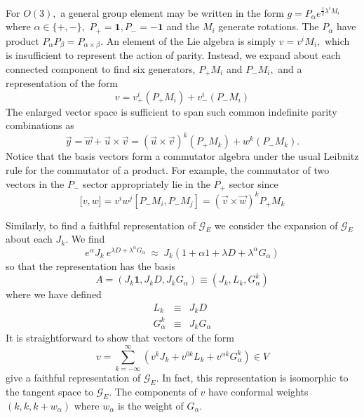 \documentclass[a4paper,12pt]{article}
\begin{document}
For $O(3),$ a general group element may be written in the form $g=P_{\alpha
}e^{\frac{1}{2}\lambda ^{i}M_{i}}$ where $\alpha \in \{+,-\},$ $P_{+}=%
\mathbf{1},P_{-}=-\mathbf{1}$ and the $M_{i}$ generate rotations. The $%
P_{\alpha }$ have product $P_{\alpha }P_{\beta }=P_{\alpha \times \beta }.$
An element of the Lie algebra is simply $v=v^{i}M_{i},$ which is
insufficient to represent the action of parity. Instead, we expand about
each connected component to find six generators, $P_{+}M_{i}$ and $%
P_{-}M_{i},$ and a representation of the form 
\begin{equation}
v=v_{+}^{i}(P_{+}M_{i})+v_{-}^{i}(P_{-}M_{i})
\end{equation}
The enlarged vector space is sufficient to span such common indefinite
parity combinations as 
\begin{equation}
\vec{y}=\vec{w}+\vec{u}\times \vec{v}=(\vec{u}\times \vec{v}%
)^{k}(P_{+}M_{k})+w^{k}(P_{-}M_{k}).
\end{equation}
Notice that the basis vectors form a commutator algebra under the usual
Leibnitz rule for the commutator of a product. For example, the commutator
of two vectors in the $P_{-}$ sector appropriately lie in the $P_{+}$ sector
since 
\begin{equation}
\lbrack v,w]=v^{i}w^{j}[P_{-}M_{i},P_{-}M_{j}]=(\vec{v}\times \vec{w}%
)^{k}P_{+}M_{k}
\end{equation}

Similarly, to find a faithful representation of $\mathcal{G}_{E}$ we
consider the expansion of $\mathcal{G}_{E}$ about each $J_{k}.$ We find 
\begin{equation}
e^{\alpha }J_{k}\ e^{\lambda D+\lambda ^{\alpha }G_{\alpha }}\ \approx\
J_{k}(1+\alpha 1+\lambda D+\lambda ^{\alpha }G_{\alpha })
\end{equation}
so that the representation has the basis 
\begin{equation}
A=(J_{k}\mathbf{1},J_{k}D,J_{k}G_{\alpha })\equiv (J_{k},L_{k},G_{\alpha
}^{k})
\end{equation}
where we have defined 
\begin{eqnarray}
L_{k} &\equiv &J_{k}D \\
G_{\alpha }^{k} &\equiv &J_{k}G_{\alpha }
\end{eqnarray}
It is straightforward to show that vectors of the form 
\begin{equation}
v=\sum_{k=-\infty }^{\infty }\left( v^{k}J_{k}+v^{0k}L_{k}+v^{\alpha
k}G_{\alpha }^{k}\right) \in V
\end{equation}
give a faithful representation of $\mathcal{G}_{E}.$ In fact, this
representation is isomorphic to the tangent space to $\mathcal{G}_{E}.$ The
components of $v$ have conformal weights $(k,k,k+w_{\alpha })$ where $%
w_{\alpha }$ is the weight of $G_{\alpha }.$
\end{document}
